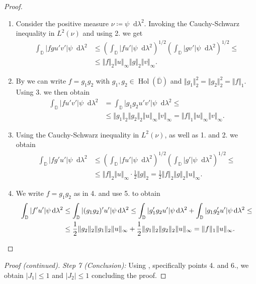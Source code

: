 \documentclass[letterpaper, 11pt]{article}
\newcommand{\D}{\mathbb{D}}
\newcommand{\1}{\mathds{1}}
\newcommand{\dd}{\mathop{}\!\mathrm{d}}
\newcommand{\cl}[1]{\overline{#1}}
\DeclareMathOperator*{\Hol}{Hol}
\theoremstyle{definition}
\begin{document}
\begin{proof} {\ }
\begin{enumerate}
    \item Consider the positive measure $\nu \coloneqq \psi \dd \lambda^2$. Invoking the Cauchy-Schwarz inequality in $L^2(\nu)$ and using 2. we get
    \begin{align*}
      \int_\D \vert f g u' v' \vert \psi \dd \lambda^2 &\leq \left( \int_\D \vert f u' \vert \psi \dd \lambda^2 \right)^{1/2} \left( \int_\D \vert g v' \vert \psi \dd \lambda^2 \right)^{1/2} \leq \\
      &\leq \Vert f \Vert_2 \Vert u \Vert_\infty \Vert g \Vert_2 \Vert v \Vert_\infty.
    \end{align*}

    \item By  we can write $f = g_1 g_2$ with $g_1, g_2 \in \Hol(\cl{\D})$ and $\Vert g_1 \Vert_2^2 = \Vert g_2 \Vert_2^2 = \Vert f \Vert_1$. Using 3. we then obtain
    \begin{align*}
      \int_\D \vert f u' v' \vert \psi \dd \lambda^2 &= \int_\D \vert g_1 g_2 u' v' \vert \psi \dd \lambda^2 \leq \\
      &\leq \Vert g_1 \Vert_2 \Vert g_2 \Vert_2 \Vert u \Vert_\infty \Vert v \Vert_\infty = \Vert f \Vert_1 \Vert u \Vert_\infty \Vert v \Vert_\infty.
    \end{align*}

    \item Using the Cauchy-Schwarz inequality in $L^2(\nu)$, as well as 1. and 2. we obtain
    \begin{align*}
      \displaystyle \int_\D \vert f g' u' \vert \psi \dd \lambda^2 &\leq \left( \int_\D \vert f u' \vert \psi \dd \lambda^2 \right)^{1/2} \left( \int_\D \vert g' \vert \psi \dd \lambda^2 \right)^{1/2} \leq \\
      &\leq \Vert f \Vert_2 \Vert u \Vert_\infty \cdot \frac{1}{2} \Vert g \Vert_2 = \frac{1}{2} \Vert f \Vert_2 \Vert g \Vert_2 \Vert u \Vert_\infty.
    \end{align*}

    \item We write $f = g_1 g_2$ as in 4. and use 5. to obtain
    \begin{align*}
      \int_\D \vert f' u' \vert \psi \dd \lambda^2 &\leq \int_\D \vert (g_1 g_2)' u' \vert \psi \dd \lambda^2 \leq \int_\D \vert g_1' g_2 u' \vert \psi \dd \lambda^2 + \int_\D \vert g_1 g_2' u' \vert \psi \dd \lambda^2 \leq \\
      &\leq \frac{1}{2} \Vert g_2 \Vert_2 \Vert g_1 \Vert_2 \Vert u \Vert_\infty + \frac{1}{2} \Vert g_1 \Vert_2 \Vert g_2 \Vert_2 \Vert u \Vert_\infty = \Vert f \Vert_1 \Vert u \Vert_\infty. \qedhere
    \end{align*}
  \end{enumerate}
\end{proof}

\begin{proof}[Proof (continued)]
  \textit{Step 7 (Conclusion):} Using , specifically points 4. and 6., we obtain $\vert J_1 \vert \leq 1$ and $\vert J_2 \vert \leq 1$ concluding the proof.
\end{proof}

\clearpage
{}
{}
\printbibliography
\end{document}

